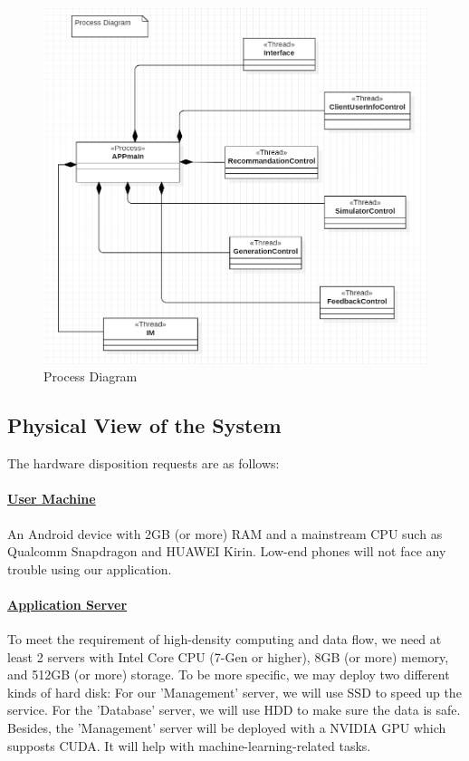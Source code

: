 \documentclass[10pt]{article}
\begin{document}
\begin{figure}[H]
    \centering
    
    \includegraphics[width=14cm]{process.png}
    \caption{Process Diagram}
    \label{Process Diagram}
\end{figure}

\subsection{Physical View of the System}
The hardware disposition requests are as follows:

\paragraph{\underline{User Machine}} An Android device with 2GB (or more) RAM and a mainstream CPU such as Qualcomm Snapdragon and HUAWEI Kirin. Low-end phones will not face any trouble using our application.

\paragraph{\underline{Application Server}} To meet the requirement of high-density computing and data flow, we need at least 2 servers with Intel Core CPU (7-Gen or higher), 8GB (or more) memory, and 512GB (or more) storage. To be more specific, we may deploy two different kinds of hard disk: For our 'Management' server, we will use SSD to speed up the service. For the 'Database' server, we will use HDD to make sure the data is safe. Besides, the 'Management' server will be deployed with a NVIDIA GPU which supposts CUDA. It will help with machine-learning-related tasks. 
\end{document}
